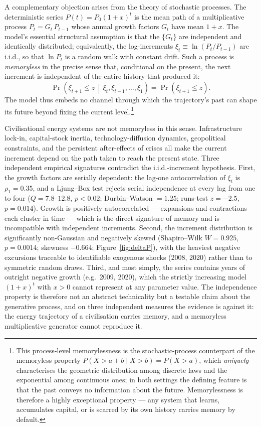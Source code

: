A complementary objection arises from the theory of stochastic processes. The deterministic
series $P(t)=P_0(1+x)^t$ is the mean path of a multiplicative process $P_t=G_t\,P_{t-1}$
whose annual growth factors $G_t$ have mean $1+x$. The model's essential structural
assumption is that the $\{G_t\}$ are independent and identically distributed; equivalently,
the log-increments $\xi_t\equiv\ln(P_t/P_{t-1})$ are i.i.d., so that $\ln P_t$ is a random
walk with constant drift. Such a process is \emph{memoryless} in the precise sense that,
conditional on the present, the next increment is independent of the entire history that
produced it:
\begin{equation}
\label{eq:memoryless}
\Pr\!\left(\xi_{t+1}\le z \,\middle|\, \xi_t,\xi_{t-1},\dots,\xi_1\right)
   = \Pr\!\left(\xi_{t+1}\le z\right).
\end{equation}
The model thus embeds no channel through which the trajectory's past can shape its future
beyond fixing the current level.\footnote{This process-level memorylessness is the
stochastic-process counterpart of the memoryless property $P(X>a+b\mid X>b)=P(X>a)$, which
\emph{uniquely} characterises the geometric distribution among discrete laws and the
exponential among continuous ones; in both settings the defining feature is that the past
conveys no information about the future. Memorylessness is therefore a highly exceptional
property --- any system that learns, accumulates capital, or is scarred by its own history
carries memory by default.}

Civilisational energy systems are not memoryless in this sense. Infrastructure lock-in,
capital-stock inertia, technology-diffusion dynamics, geopolitical constraints, and the
persistent after-effects of crises all make the current increment depend on the path taken
to reach the present state. Three independent empirical signatures contradict the
i.i.d.-increment hypothesis. First, the growth factors are serially dependent: the lag-one
autocorrelation of $\xi_t$ is $\rho_1=0.35$, and a Ljung--Box test rejects serial
independence at every lag from one to four ($Q=7.8$--$12.8$, $p<0.02$; Durbin--Watson
$=1.25$; runs-test $z=-2.5$, $p=0.014$). Growth is positively autocorrelated --- expansions
and contractions each cluster in time --- which is the direct signature of memory and is
incompatible with independent increments. Second, the increment distribution is
significantly non-Gaussian and negatively skewed (Shapiro--Wilk $W=0.925$, $p=0.0014$;
skewness $-0.664$; Figure~\ref{fig:deltaP}), with the heaviest negative excursions
traceable to identifiable exogenous shocks (2008, 2020) rather than to symmetric random
draws. Third, and most simply, the series contains years of outright negative growth
(e.g.\ 2009, 2020), which the strictly increasing model $(1+x)^t$ with $x>0$ cannot
represent at any parameter value. The independence property is therefore not an abstract
technicality but a testable claim about the generative process, and on three independent
measures the evidence is against it: the energy trajectory of a civilisation carries
memory, and a memoryless multiplicative generator cannot reproduce it.

